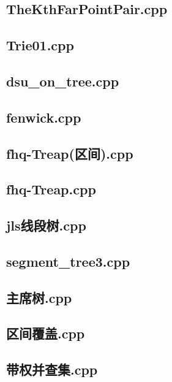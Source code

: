 \subsection{TheKthFarPointPair.cpp}

\subsection{Trie01.cpp}

\subsection{dsu\_on\_tree.cpp}

\subsection{fenwick.cpp}

\subsection{fhq-Treap(区间).cpp}

\subsection{fhq-Treap.cpp}

\subsection{jls线段树.cpp}

\subsection{segment\_tree3.cpp}

\subsection{主席树.cpp}

\subsection{区间覆盖.cpp}

\subsection{带权并查集.cpp}

